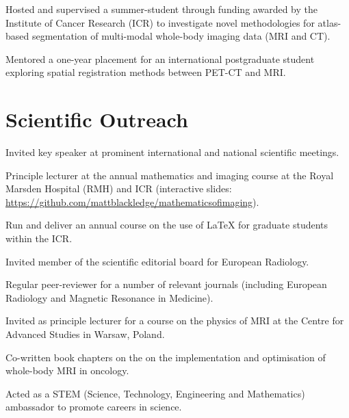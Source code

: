 \documentclass[]{mbcv}
\begin{document}
{\begin{tightemize}
\item Hosted and supervised a summer-student through funding awarded by the Institute of Cancer Research (ICR) to investigate novel methodologies for atlas-based segmentation of multi-modal whole-body imaging data (MRI and CT). 

\item Mentored a one-year placement for an international postgraduate student exploring spatial registration methods between PET-CT and MRI.

\end{tightemize}
\sectionsep

\section{Scientific Outreach}
\vspace*{10pt}
\begin{tightemize}
\item Invited key speaker at prominent international and national scientific meetings.
\item Principle lecturer at the annual mathematics and imaging course at the Royal Marsden Hospital (RMH) and ICR (interactive slides: \href{https://github.com/mattblackledge/mathematicsofimaging}{https://github.com/mattblackledge/mathematicsofimaging}).
\item Run and deliver an annual course on the use of LaTeX for graduate students within the ICR. 
\item Invited member of the scientific editorial board for European Radiology.
\item Regular peer-reviewer for a number of relevant journals (including European Radiology and Magnetic Resonance in Medicine).
\item Invited as principle lecturer for a course on the physics of MRI at the Centre for Advanced Studies in Warsaw, Poland.
\item Co-written book chapters on the on the implementation and optimisation of whole-body MRI in oncology.
\item Acted as a STEM (Science, Technology, Engineering and Mathematics) ambassador to promote careers in science.
\end{tightemize}
\sectionsep


}
\end{document}
